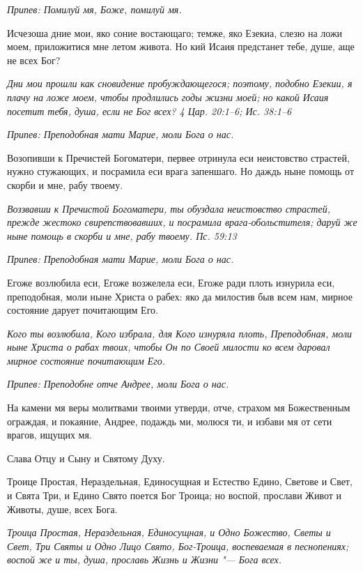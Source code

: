\itshape Припев:\normalfont{} Помилуй мя, Боже, помилуй мя.


Исчезоша дние мои, яко соние востающаго; темже, яко Езекиа, слезю на ложи моем, приложитися мне летом живота. Но кий Исаия предстанет тебе, душе, аще не всех Бог?


\itshape Дни мои прошли как сновидение пробуждающегося; поэтому, подобно Езекии, я плачу на ложе моем, чтобы продлились годы жизни моей; но какой Исаия посетит тебя, душа, если не Бог всех? 4 Цар. 20:1–6; Ис. 38:1–6\normalfont{}


\itshape Припев:\normalfont{} Преподобная мати Марие, моли Бога о нас.


Возопивши к Пречистей Богоматери, первее отринула еси неистовство страстей, нужно стужающих, и посрамила еси врага запеншаго. Но даждь ныне помощь от скорби и мне, рабу твоему.


\itshape Воззвавши к Пречистой Богоматери, ты обуздала неистовство страстей, прежде жестоко свирепствовавших, и посрамила врага-обольстителя; даруй же ныне помощь в скорби и мне, рабу твоему. Пс. 59:13\normalfont{}


\itshape Припев:\normalfont{} Преподобная мати Марие, моли Бога о нас.


Егоже возлюбила еси, Егоже возжелела еси, Егоже ради плоть изнурила еси, преподобная, моли ныне Христа о рабех: яко да милостив быв всем нам, мирное состояние дарует почитающим Его.


\itshape Кого ты возлюбила, Кого избрала, для Кого изнуряла плоть, Преподобная, моли ныне Христа о рабах твоих, чтобы Он по Своей милости ко всем даровал мирное состояние почитающим Его.\normalfont{}


\itshape Припев:\normalfont{} Преподобне отче Андрее, моли Бога о нас.


На камени мя веры молитвами твоими утверди, отче, страхом мя Божественным ограждая, и покаяние, Андрее, подаждь ми, молюся ти, и избави мя от сети врагов, ищущих мя.


Слава Отцу и Сыну и Святому Духу.


Троице Простая, Нераздельная, Единосущная и Естество Едино, Светове и Свет, и Свята Три, и Едино Свято поется Бог Троица; но воспой, прослави Живот и Животы, душе, всех Бога.


\itshape Троица Простая, Нераздельная, Единосущная, и Одно Божество, Светы и Свет, Три Святы и Одно Лицо Свято, Бог-Троица, воспеваемая в песнопениях; воспой же и ты, душа, прославь Жизнь и Жизни "--- Бога всех.\normalfont{}


